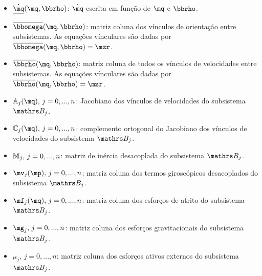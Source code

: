 \documentclass[a4paper,11pt,brazil,fleqn]{article}
\begin{document}
\begin{itemize}
\item $\underline{\dot{\mq}}(\mq,\mrho)$: $\dot{\mq}$ escrita em fun\c{c}\~ao de $\mq$ e $\mrho$.
\item $\overline{\momega}(\mq,\mrho)$: matriz coluna dos v\'inculos de orienta\c{c}\~ao entre subsistemas. As equa\c{c}\~oes v\'inculares s\~ao dadas por $\overline{\momega}(\mq,\mrho) = \mzr $.
\item $\overline{\mrho}(\mq,\mrho)$: matriz coluna de todos os v\'inculos de velocidades entre subsistemas. As equa\c{c}\~oes v\'inculares s\~ao dadas por $\overline{\mrho}(\mq,\mrho) = \mzr $.
\item $\mA_j(\mq), \,j=0, ..., n$: Jacobiano dos v\'inculos de velocidades do subsistema $\ssB_j$.
\item $\mC_j(\mq), \,j=0, ..., n$: complemento ortogonal do Jacobiano dos v\'inculos de velocidades do subsistema $\ssB_j$.
\item $\mathbb{M}_j, \,j=0, ..., n$: matriz de in\'ercia desacoplada do subsistema $\ssB_j$.
\item $\mv_j(\mp), \,j=0, ..., n$: matriz coluna dos termos girosc\'opicos desacoplados do subsistema $\ssB_j$.
\item $\mf_j(\mq), \,j=0, ..., n$: matriz coluna dos esfor\c{c}os de atrito do subsistema $\ssB_j$.
\item $\mg_j, \,j=0, ..., n$: matriz coluna dos esfor\c{c}os gravitacionais do subsistema $\ssB_j$.
\item $\mu_j, \,j=0, ..., n$: matriz coluna dos esfor\c{c}os ativos externos do subsistema $\ssB_j$.
\end{itemize}
\end{document}
